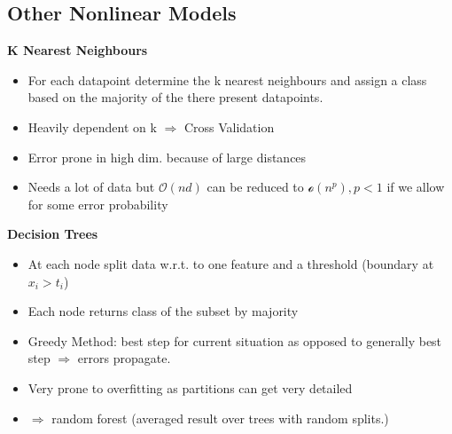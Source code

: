 \subsection{Other Nonlinear Models}

\textbf{K Nearest Neighbours}
\begin{itemize}
    \item For each datapoint determine the k nearest neighbours and assign a class based on the majority of the there present datapoints.
    \item Heavily dependent on k $\Rightarrow$ Cross Validation
    \item Error prone in high dim. because of large distances
    \item Needs a lot of data but $\mathcal{O}(nd)$ can be reduced to $\mathcal{o}(n^p),p<1$ if we allow for some error probability
\end{itemize}
\textbf{Decision Trees}
\begin{itemize}
    \item At each node split data w.r.t. to one feature and a threshold (boundary at $x_i > t_i$)
    \item Each node returns class of the subset by majority
    \item Greedy Method: best step for current situation as opposed to generally best step $\Rightarrow$ errors propagate.
    \item Very prone to overfitting as partitions can get very detailed
    \item $\Rightarrow$ random forest (averaged result over trees with random splits.)
\end{itemize}


